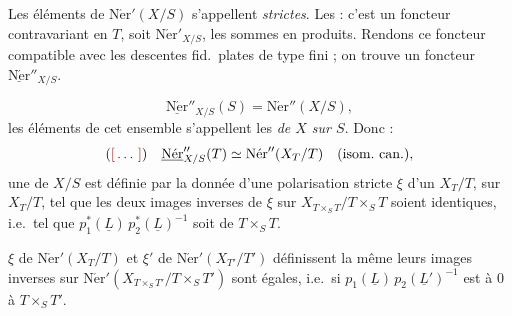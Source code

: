 \documentclass[11pt,a4paper]{article}
\begin{document}
Les éléments de $\mathrm{N\acute{e}r}'(X/S)$ s'appellent    \emph{strictes}. Les  : c'est un foncteur contravariant en $T$, soit $\mathrm{N\acute{e}r}'_{X/S}$,   \struck{\ill{}} les sommes en produits. Rendons ce foncteur compatible avec les descentes fid.\ plates de type fini ; on trouve un foncteur $\underline{\mathrm{N\acute{e}r}}''_{X/S}$. 

\[
\underline{\mathrm{N\acute{e}r}}''_{X/S}(S) = \mathrm{N\acute{e}r}''(X/S),
\]
les éléments de cet ensemble s'appellent les    \emph{de $X$ sur $S$}. Donc :
\[
\text{(\ill{})}\quad \underline{\mathrm{N\acute{e}r}}''_{X/S}(T) \simeq \mathrm{N\acute{e}r}''(X_T/T) \quad \text{(isom.\ can.)},
\]
une  de $X/S$ est définie par la donnée d'une polarisation stricte  $\xi$ d'un $X_T/T$, \struck{\ill{}} sur $X_T/T$,  tel que les deux images inverses de $\xi$ sur $X_{T \times_S T}/T \times_S T$ soient identiques, i.e.\ tel que $p_1^{*}(\underline{L})\, p_2^{*}(\underline{L})^{-1}$ soit de    $T \times_S T$.

$\xi$ de $\mathrm{N\acute{e}r}'(X_T/T)$ et $\xi'$ de $\mathrm{N\acute{e}r}'(X_{T'}/T')$ définissent la même   leurs images inverses sur $\mathrm{N\acute{e}r}'(X_{T \times_S T'}/T \times_S T')$ sont égales, i.e.\ si $p_1(\underline{L})\, p_2(\underline{L}')^{-1}$ est  à $0$  à $T \times_S T'$.
\end{document}
